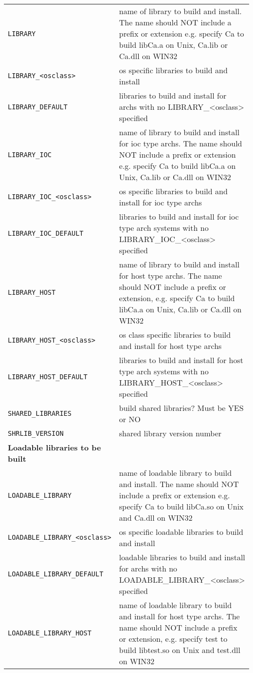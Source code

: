 \begin{center}
\begin{longtable}{p{2.94784in}p{3.76247in}}
\verb|LIBRARY| & name of library to build and install. The name should NOT include a prefix or extension e.g. specify Ca to build libCa.a on Unix, Ca.lib or Ca.dll on WIN32\\
\verb|LIBRARY_<osclass>| & os specific libraries to build and install\\
\verb|LIBRARY_DEFAULT| & libraries to build and install for archs with no LIBRARY\_\textless{}osclass\textgreater{} specified\\
\verb|LIBRARY_IOC| & name of library to build and install for ioc type archs. The name should NOT include a prefix or extension e.g. specify Ca to build libCa.a on Unix, Ca.lib or Ca.dll on WIN32\\
\verb|LIBRARY_IOC_<osclass>| & os specific libraries to build and install for ioc type archs\\
\verb|LIBRARY_IOC_DEFAULT| & libraries to build and install for ioc type arch systems with no LIBRARY\_IOC\_\textless{}osclass\textgreater{} specified\\
\verb|LIBRARY_HOST| & name of library to build and install for host type archs. The name should NOT include a prefix or extension, e.g. specify Ca to build libCa.a on Unix, Ca.lib or Ca.dll on WIN32\\
\verb|LIBRARY_HOST_<osclass>| & os class specific libraries to build and install for host type archs\\
\verb|LIBRARY_HOST_DEFAULT| & libraries to build and install for host type arch systems with no LIBRARY\_HOST\_\textless{}osclass\textgreater{} specified\\
\verb|SHARED_LIBRARIES| & build shared libraries? Must be YES or NO\\
\verb|SHRLIB_VERSION| & shared library version number\\
\textbf{Loadable libraries to be built} & \\
\verb|LOADABLE_LIBRARY| & name of loadable library to build and install. The name should NOT include a prefix or extension e.g. specify Ca to build libCa.so on Unix and Ca.dll on WIN32\\
\verb|LOADABLE_LIBRARY_<osclass>| & os specific loadable libraries to build and install\\
\verb|LOADABLE_LIBRARY_DEFAULT| & loadable libraries to build and install for archs with no LOADABLE\_LIBRARY\_\textless{}osclass\textgreater{} specified\\
\verb|LOADABLE_LIBRARY_HOST| & name of loadable library to build and install for host type archs. The name should NOT include a prefix or extension, e.g. specify test to build libtest.so on Unix and test.dll on WIN32\\

\end{longtable}
\end{center}
